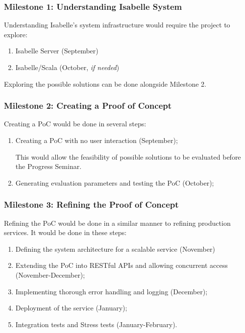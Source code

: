 \subsubsection{Milestone 1: Understanding Isabelle System}

Understanding Isabelle's system infrastructure would require the project to explore:
\begin{enumerate}
    \item Isabelle Server (September)
    \item Isabelle/Scala (October, \emph{if needed})
\end{enumerate}

Exploring the possible solutions can be done alongside Milestone 2.

\subsubsection{Milestone 2: Creating a Proof of Concept}

Creating a PoC would be done in several steps:
\begin{enumerate}
    \item Creating a PoC with no user interaction (September);
          
          This would allow the feasibility of possible solutions to be evaluated before the Progress Seminar.

    \item Generating evaluation parameters and testing the PoC (October);
\end{enumerate}

\subsubsection{Milestone 3: Refining the Proof of Concept}

Refining the PoC would be done in a similar manner to refining production services. It would be done in these steps:
\begin{enumerate}
    \item Defining the system architecture for a scalable service (November)
    \item Extending the PoC into RESTful APIs and allowing concurrent access (November-December);
    \item Implementing thorough error handling and logging (December);
    \item Deployment of the service (January);
    \item Integration tests and Stress tests (January-February).
\end{enumerate}

